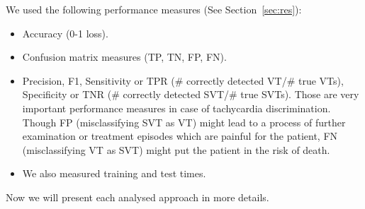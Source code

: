 We used the following performance measures (See 
Section~\ref{sec:res}):
\begin{itemize}
	\item Accuracy (0-1 loss).
	\item Confusion matrix measures (TP, TN, FP, FN).
	\item Precision,  F1,
	Sensitivity or 
	TPR ($\#$ correctly detected VT/$\#$ true VTs), 
	Specificity or 
	TNR ($\#$ correctly detected SVT/$\#$ true SVTs). 
	Those are very important performance measures in case of 
	tachycardia discrimination. Though FP (misclassifying SVT as VT) 
	might lead 	to a 	process of further examination or treatment 
	episodes which are 
	painful for the patient, FN (misclassifying VT as SVT) might put 
	the patient in the risk of death.  
	\item We also measured training 
	and test times.
\end{itemize}
Now we will present each analysed approach in more details.

